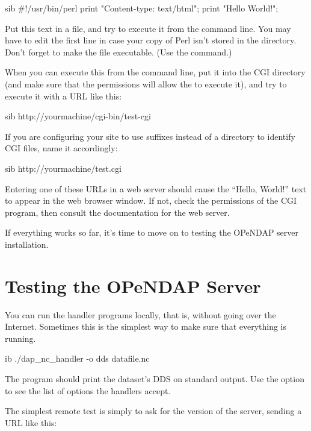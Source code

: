 \documentclass{dods-book}
\begin{document}
\begin{vcode}{sib}
#!/usr/bin/perl
print "Content-type: text/html\n\n";
print "Hello World!\n\n";
\end{vcode}

Put this text in a file, and try to execute it from the command line.
You may have to edit the first line in case your copy of Perl isn't
stored in the  directory. Don't forget to make the file
executable. (Use the  command.)

When you can execute this from the command line, put it into the CGI
directory (and make sure that the permissions will allow the
 to execute it), and try to execute it with a URL like
this:

\begin{vcode}{sib}
http://yourmachine/cgi-bin/test-cgi
\end{vcode}

If you are configuring your site to use suffixes instead of a
directory to identify CGI files, name it accordingly:

\begin{vcode}{sib}
http://yourmachine/test.cgi
\end{vcode}

Entering one of these URLs in a web server should cause the ``Hello,
World!'' text to appear in the web browser window.  If not, check the
permissions of the CGI program, then consult the documentation for the
web server.

If everything works so far, it's time to move on to testing the
OPeNDAP server installation.  

\section{Testing the OPeNDAP Server}

You can run the handler programs locally, that is, without going over
the Internet.  Sometimes this is the simplest way to make sure that
everything is running.  

\begin{vcode}{ib}
./dap_nc_handler -o dds  datafile.nc
\end{vcode}

The program should print the dataset's DDS on standard output. Use the
 option to see the list of options the handlers accept.

The simplest remote test is simply to ask for the version of
the server, sending a URL like this:
\end{document}
